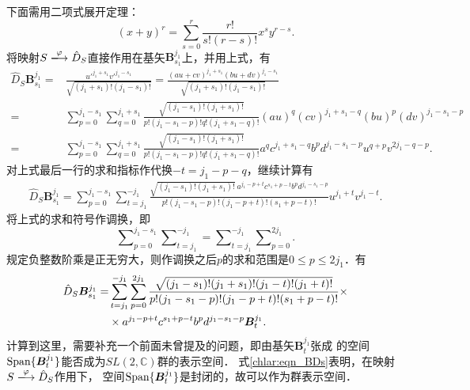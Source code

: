 下面需用二项式展开定理：
\begin{equation}\label{chlar:eqn_binom}
    (x+y)^r = \sum_{s=0}^{r}\frac{r!}{s!(r-s)!} x^s y^{r-s} .
\end{equation}
将映射$S \xlongrightarrow{\varphi} \hat{D}_S$直接作用在基矢$\boldsymbol{B}^{j_1}_{s_1}$上，并用上式，有
\begin{align*}
    \hat{D}_S \boldsymbol{B}^{j_1}_{s_1} =& \frac{u'^{j_1+s_1} v'^{j_1-s_1}}{\sqrt{(j_1+s_1)!(j_1-s_1)!}}
    =\frac{(au+cv)^{j_1+s_1} (bu+dv)^{j_1-s_1}}{\sqrt{(j_1+s_1)!(j_1-s_1)!}} \\
    =& \sum_{p=0}^{j_1-s_1} \sum_{q=0}^{j_1+s_1} 
    \frac{\sqrt{(j_1-s_1)! (j_1+s_1)! } }{p!(j_1-s_1-p)! q! (j_1+s_1-q)!}
    (au)^q (cv)^{j_1+s_1-q} (bu)^p (dv)^{j_1-s_1-p}  \\
    =& \sum_{p=0}^{j_1-s_1} \sum_{q=0}^{j_1+s_1} 
    \frac{\sqrt{(j_1-s_1)! (j_1+s_1)! } }{p!(j_1-s_1-p)! q! (j_1+s_1-q)!}
    a^q c^{j_1+s_1-q} b^p d^{j_1-s_1-p} u^{q+p} v^{2j_1 -q-p} .
\end{align*}
对上式最后一行的求和指标作代换$-t=j_1-p-q$，继续计算有
\begin{align*}
    \hat{D}_S \boldsymbol{B}^{j_1}_{s_1} = \sum_{p=0}^{j_1-s_1} \sum_{t=j_1}^{-j_1} 
    \frac{\sqrt{(j_1-s_1)! (j_1+s_1)!}\ a^{j_1-p+t} c^{s_1+p-t} b^p d^{j_1-s_1-p} }
    {p!(j_1-s_1-p)! (j_1-p+t)! (s_1+p-t)!}  
    u^{j_1 +t} v^{j_1 -t} .
\end{align*}
将上式的求和符号作调换，即
\begin{equation*}
    \sum\nolimits_{p=0}^{j_1-s_1} \sum\nolimits_{t=j_1}^{-j_1} 
    = \sum\nolimits_{t=j_1}^{-j_1} \sum\nolimits_{p=0}^{2j_1} .
\end{equation*}    
{\kaishu 规定负整数阶乘是正无穷大}，则作调换之后$p$的求和范围是$0\leqslant p \leqslant 2j_1$．有
\begin{align}
    \hat{D}_S \boldsymbol{B}^{j_1}_{s_1} =& \sum_{t=j_1}^{-j_1}  \sum_{p=0}^{2j_1} 
        \frac{\sqrt{(j_1-s_1)! (j_1+s_1)! (j_1-t)! (j_1+t)!}  }
        {p!(j_1-s_1-p)! (j_1-p+t)! (s_1+p-t)!}\times \notag \\
        & \times a^{j_1-p+t} c^{s_1+p-t} b^p d^{j_1-s_1-p} \boldsymbol{B}^{j_1}_{t} . \label{chlar:eqn_BDs}
\end{align}
计算到这里，需要补充一个前面未曾提及的问题，即由基矢$\boldsymbol{B}^{j_1}_{t}$张成
的空间${\rm Span}\{\boldsymbol{B}^{j_1}_{t}\}$能否成为$SL(2,\mathbb{C})$群的表示空间．
式\eqref{chlar:eqn_BDs}表明，在映射$S \xlongrightarrow{\varphi}  \hat{D}_S$作用下，
空间${\rm Span}\{\boldsymbol{B}^{j_1}_{t}\}$是封闭的，故可以作为群表示空间．
